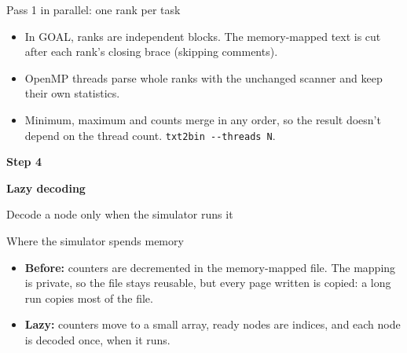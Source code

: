 \documentclass[aspectratio=169,11pt]{beamer}
\newcommand{\diagram}[1]{\resizebox{\linewidth}{!}{}}
\newcommand{\stepframe}[3]{%
\begin{frame}
\vfill
{\centering
{\usebeamercolor[fg]{title}\large\bfseries Step #1\par}
\vspace{1mm}
{\usebeamercolor[fg]{title}\huge\bfseries #2\par}
\vspace{3mm}
{\color{black!60}#3\par}
\vspace{9mm}
\def\activestep{#1}%
\resizebox{0.85\linewidth}{!}{}\par}
\vfill
\end{frame}}
\begin{document}
\begin{frame}{Pass 1 in parallel: one rank per task}
\vspace{2mm}
{\centering\resizebox{0.8\linewidth}{!}{}\par}
\vspace{5mm}
\begin{itemize}
\item In GOAL, ranks are independent blocks. The memory-mapped text is cut after each rank's closing brace (skipping comments).
\item OpenMP threads parse whole ranks with the unchanged scanner and keep their own statistics.
\item Minimum, maximum and counts merge in any order, so the result doesn't depend on the thread count. \texttt{txt2bin -{}-threads N}.
\end{itemize}
\end{frame}


\stepframe{4}{Lazy decoding}{Decode a node only when the simulator runs it}

\begin{frame}{Where the simulator spends memory}
\centering\diagram{lazy-flow}
\par\raggedright\vspace{5mm}
\small
\begin{itemize}
\item \textbf{Before:} counters are decremented in the memory-mapped file. The mapping is private, so the file stays reusable, but every page written is copied: a long run copies most of the file.
\item \textbf{Lazy:} counters move to a small array, ready nodes are indices, and each node is decoded once, when it runs.
\end{itemize}
\end{frame}
\end{document}
